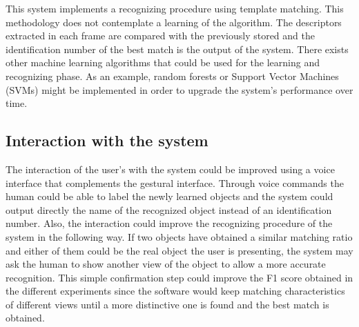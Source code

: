 	This system implements a recognizing procedure using template matching. 
	This methodology does not contemplate a learning of the algorithm. 
	The descriptors extracted in each frame are compared with the previously stored and the identification number of the best match is the output of the system.  
	There exists other machine learning algorithms that could be used for the learning and recognizing phase. 
	As an example, random forests \cite{Gall2012} or Support Vector Machines (SVMs) \cite{Pontil1998} might be implemented in order to upgrade the system's performance over time. 

	\subsection{Interaction with the system}

	The interaction of the user's with the system could be improved using a voice interface that complements the gestural interface. 
	Through voice commands the human could be able to label the newly learned objects and the system could output directly the name of the recognized object instead of an identification number. 
	Also, the interaction could improve the recognizing procedure of the system in the following way. 
	If two objects have obtained a similar matching ratio and either of them could be the real object the user is presenting, the system may ask the human to show another view of the object to allow a more accurate recognition. 
	This simple confirmation step could improve the F1 score obtained in the different experiments since the software would keep matching characteristics of different views until a more distinctive one is found and the best match is obtained. 
